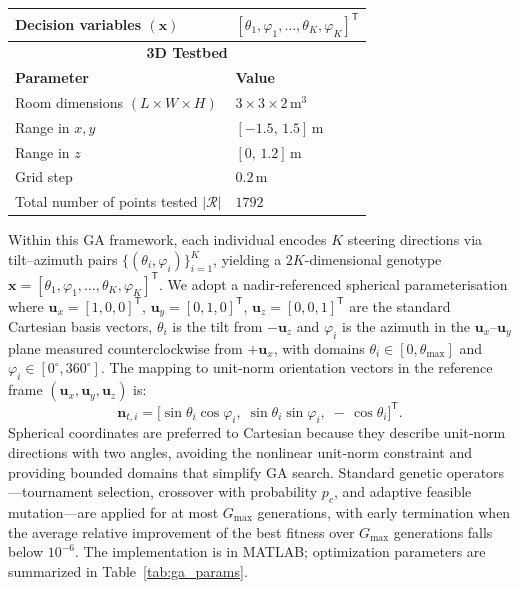 \documentclass[journal]{IEEEtran}
\newcommand{\added}[1]{{\color{blue}#1}}
\begin{document}
\begin{table}[tbh]
\begin{tabular}{|l|l|}
Decision variables $(\mathbf x)$    & \([\theta_{1},\varphi_{1},\dots,\theta_{K},\varphi_{K}]^{\mathsf T}\) \\ \hline
\multicolumn{2}{|c|}{\textbf{3D Testbed}} \\ \hline
\textbf{Parameter}                  & \textbf{Value}                         \\ \hline
Room dimensions \((L\times W \times H)\) & \(3 \times 3 \times 2\,\mathrm{m^3}\)  \\ \hline
Range in \(x,y\)                    & \([-1.5,\,1.5]\,\mathrm{m}\)           \\ \hline
Range in \(z\)                      & \([0,\,1.2]\,\mathrm{m}\)              \\ \hline
Grid step                           & \(0.2\,\mathrm{m}\)                    \\ \hline
Total number of points tested \(|\mathcal{R}|\)  & \(1792\)                               \\ \hline
\end{tabular}
\end{table}

Within this GA framework, each individual encodes \(K\) steering directions via tilt–azimuth pairs
\(\{(\theta_i,\varphi_i)\}_{i=1}^{K}\), yielding a \(2K\)-dimensional genotype
\(\mathbf x = [\theta_1,\varphi_1,\dots,\theta_K,\varphi_K]^{\mathsf T}\).
We adopt a nadir‐referenced spherical parameterisation \added{where $\mathbf u_x=[1,0,0]^{\mathsf T}$, $\mathbf u_y=[0,1,0]^{\mathsf T}$, $\mathbf u_z=[0,0,1]^{\mathsf T}$ are the standard Cartesian basis vectors,} \(\theta_i\) is the tilt from \(-\mathbf u_z\) and \(\varphi_i\) is the azimuth in the \(\mathbf u_x\)–\( \mathbf u_y\) plane measured counterclockwise from \(+\mathbf u_x\),
with domains \(\theta_i\in[0,\theta_{\max}]\) and \(\varphi_i\in[0^\circ,360^\circ]\). %
The mapping to unit‐norm orientation vectors in the reference frame \((\mathbf u_x,\mathbf u_y,\mathbf u_z)\) is:
\begin{equation}
\mathbf n_{t,i}
= \bigl[\sin\theta_i\cos\varphi_i,\;\sin\theta_i\sin\varphi_i,\;-\,\cos\theta_i\bigr]^{\mathsf T}.
\end{equation}
Spherical coordinates are preferred to Cartesian because they describe unit‐norm directions with two angles, avoiding the nonlinear unit‐norm constraint and providing bounded domains that simplify GA search.
Standard genetic operators—tournament selection, crossover with probability \(p_c\), and adaptive feasible mutation—are applied for at most \(G_{\max}\) generations, 
with early termination when the average relative improvement of the best fitness over \(G_{\max}\) generations falls below \(10^{-6}\).
The implementation is in MATLAB; optimization parameters are summarized in Table~\ref{tab:ga_params}.
\end{document}
